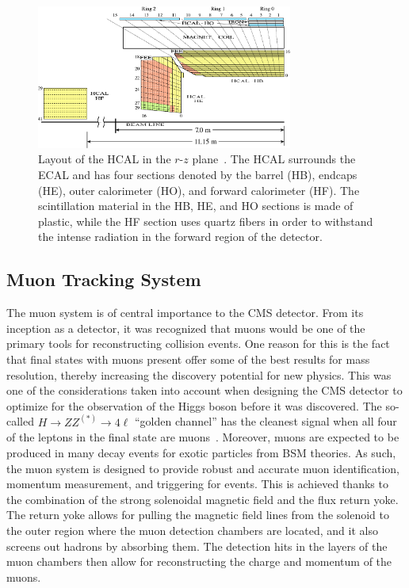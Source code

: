 \begin{figure}[htbp]
  \centering
  \includegraphics[width=0.75\textwidth]{fig/experiment/HCAL-HB-HE-HO-HF.pdf}
  \caption[
    Layout of the HCAL in the $r$-$z$ plane.
    The HCAL surrounds the ECAL and has four sections denoted by the barrel (HB), endcaps (HE), outer calorimeter (HO), and forward calorimeter (HF).
    The scintillation material in the HB, HE, and HO sections is made of plastic, while the HF section uses quartz fibers in order to withstand the intense radiation in the forward region of the detector.
  ]{
    Layout of the HCAL in the $r$-$z$ plane~\cite{Collaboration_2010_HCAL}.
    The HCAL surrounds the ECAL and has four sections denoted by the barrel (HB), endcaps (HE), outer calorimeter (HO), and forward calorimeter (HF).
    The scintillation material in the HB, HE, and HO sections is made of plastic, while the HF section uses quartz fibers in order to withstand the intense radiation in the forward region of the detector.
  }
  \label{fig:CMSHCAL}
\end{figure}

\subsection{Muon Tracking System}
\label{subsec:muonTrack}

The muon system is of central importance to the CMS detector.
From its inception as a detector, it was recognized that muons would be one of the primary tools for reconstructing collision events.
One reason for this is the fact that final states with muons present offer some of the best results for mass resolution, thereby increasing the discovery potential for new physics.
This was one of the considerations taken into account when designing the CMS detector to optimize for the observation of the Higgs boson before it was discovered.
The so-called $H\to ZZ^{(*)}\to 4\ell$ ``golden channel'' has the cleanest signal when all four of the leptons in the final state are muons~\cite{Gainer_2011}.
Moreover, muons are expected to be produced in many decay events for exotic particles from BSM theories.
As such, the muon system is designed to provide robust and accurate muon identification, momentum measurement, and triggering for events.
This is achieved thanks to the combination of the strong solenoidal magnetic field and the flux return yoke.
The return yoke allows for pulling the magnetic field lines from the solenoid to the outer region where the muon detection chambers are located, and it also screens out hadrons by absorbing them.
The detection hits in the layers of the muon chambers then allow for reconstructing the charge and momentum of the muons.

